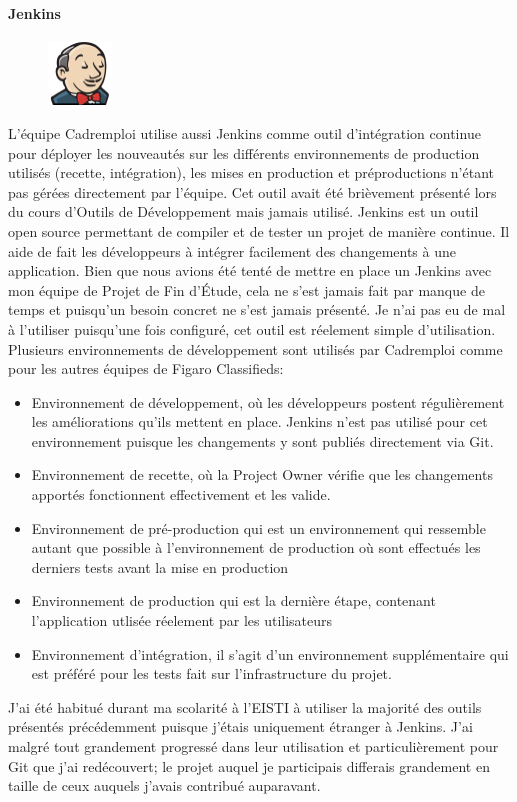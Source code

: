 \paragraph{Jenkins}
\label{par:Jenkins}
\begin{figure}
  \begin{center}
    \includegraphics[width=0.15\textwidth]{Pictures/jenkins_logo.png}
  \end{center}
\end{figure}
L'équipe Cadremploi utilise aussi Jenkins comme outil d'intégration continue pour déployer les nouveautés sur les différents environnements de production utilisés (recette, intégration), les mises en production et préproductions n'étant pas gérées directement par l'équipe.
Cet outil avait été brièvement présenté lors du cours d'Outils de Développement mais jamais utilisé.
Jenkins est un outil open source permettant de compiler et de tester un projet de manière continue.
Il aide de fait les développeurs à intégrer facilement des changements à une application.
Bien que nous avions été tenté de mettre en place un Jenkins avec mon équipe de Projet de Fin d'Étude, cela ne s'est jamais fait par manque de temps et puisqu'un besoin concret ne s'est jamais présenté.
Je n'ai pas eu de mal à l'utiliser puisqu'une fois configuré, cet outil est réelement simple d'utilisation.
Plusieurs environnements de développement sont utilisés par Cadremploi comme pour les autres équipes de Figaro Classifieds:
\begin{itemize}
  \item{Environnement de développement}, où les développeurs postent régulièrement les améliorations qu'ils mettent en place. Jenkins n'est pas utilisé pour cet environnement puisque les changements y sont publiés directement via Git.
  \item{Environnement de recette}, où la Project Owner vérifie que les changements apportés fonctionnent effectivement et les valide.
  \item{Environnement de pré-production} qui est un environnement qui ressemble autant que possible à l'environnement de production où sont effectués les derniers tests avant la mise en production
  \item{Environnement de production} qui est la dernière étape, contenant l'application utlisée réelement par les utilisateurs
  \item{Environnement d'intégration}, il s'agit d'un environnement supplémentaire qui est préféré pour les tests fait sur l'infrastructure du projet.
\end{itemize}
J'ai été habitué durant ma scolarité à l'EISTI à utiliser la majorité des outils présentés précédemment puisque j'étais uniquement étranger à Jenkins.
J'ai malgré tout grandement progressé dans leur utilisation et particulièrement pour Git que j'ai redécouvert; le projet auquel je participais differais grandement en taille de ceux auquels j'avais contribué auparavant.
